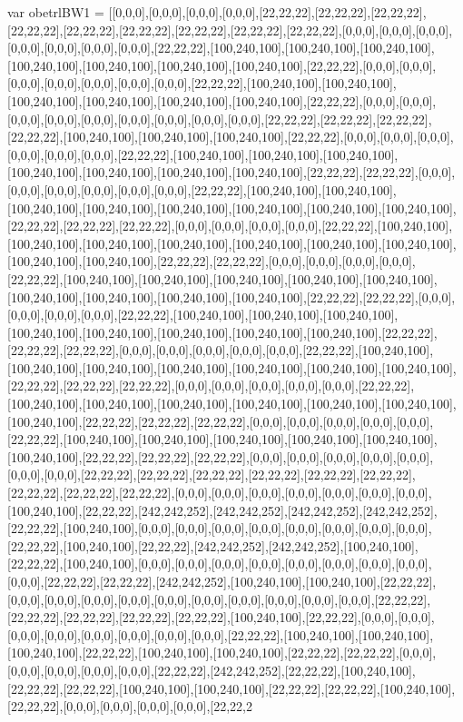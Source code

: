 var obetrlBW1 = [[0,0,0],[0,0,0],[0,0,0],[0,0,0],[22,22,22],[22,22,22],[22,22,22],[22,22,22],[22,22,22],[22,22,22],[22,22,22],[22,22,22],[22,22,22],[0,0,0],[0,0,0],[0,0,0],[0,0,0],[0,0,0],[0,0,0],[0,0,0],[22,22,22],[100,240,100],[100,240,100],[100,240,100],[100,240,100],[100,240,100],[100,240,100],[100,240,100],[22,22,22],[0,0,0],[0,0,0],[0,0,0],[0,0,0],[0,0,0],[0,0,0],[0,0,0],[22,22,22],[100,240,100],[100,240,100],[100,240,100],[100,240,100],[100,240,100],[100,240,100],[22,22,22],[0,0,0],[0,0,0],[0,0,0],[0,0,0],[0,0,0],[0,0,0],[0,0,0],[0,0,0],[0,0,0],[22,22,22],[22,22,22],[22,22,22],[22,22,22],[100,240,100],[100,240,100],[100,240,100],[22,22,22],[0,0,0],[0,0,0],[0,0,0],[0,0,0],[0,0,0],[0,0,0],[22,22,22],[100,240,100],[100,240,100],[100,240,100],[100,240,100],[100,240,100],[100,240,100],[100,240,100],[22,22,22],[22,22,22],[0,0,0],[0,0,0],[0,0,0],[0,0,0],[0,0,0],[0,0,0],[22,22,22],[100,240,100],[100,240,100],[100,240,100],[100,240,100],[100,240,100],[100,240,100],[100,240,100],[100,240,100],[22,22,22],[22,22,22],[22,22,22],[0,0,0],[0,0,0],[0,0,0],[0,0,0],[22,22,22],[100,240,100],[100,240,100],[100,240,100],[100,240,100],[100,240,100],[100,240,100],[100,240,100],[100,240,100],[100,240,100],[22,22,22],[22,22,22],[0,0,0],[0,0,0],[0,0,0],[0,0,0],[22,22,22],[100,240,100],[100,240,100],[100,240,100],[100,240,100],[100,240,100],[100,240,100],[100,240,100],[100,240,100],[100,240,100],[22,22,22],[22,22,22],[0,0,0],[0,0,0],[0,0,0],[0,0,0],[22,22,22],[100,240,100],[100,240,100],[100,240,100],[100,240,100],[100,240,100],[100,240,100],[100,240,100],[100,240,100],[22,22,22],[22,22,22],[22,22,22],[0,0,0],[0,0,0],[0,0,0],[0,0,0],[0,0,0],[22,22,22],[100,240,100],[100,240,100],[100,240,100],[100,240,100],[100,240,100],[100,240,100],[100,240,100],[22,22,22],[22,22,22],[22,22,22],[0,0,0],[0,0,0],[0,0,0],[0,0,0],[0,0,0],[22,22,22],[100,240,100],[100,240,100],[100,240,100],[100,240,100],[100,240,100],[100,240,100],[100,240,100],[22,22,22],[22,22,22],[22,22,22],[0,0,0],[0,0,0],[0,0,0],[0,0,0],[0,0,0],[22,22,22],[100,240,100],[100,240,100],[100,240,100],[100,240,100],[100,240,100],[100,240,100],[22,22,22],[22,22,22],[22,22,22],[0,0,0],[0,0,0],[0,0,0],[0,0,0],[0,0,0],[0,0,0],[0,0,0],[22,22,22],[22,22,22],[22,22,22],[22,22,22],[22,22,22],[22,22,22],[22,22,22],[22,22,22],[22,22,22],[0,0,0],[0,0,0],[0,0,0],[0,0,0],[0,0,0],[0,0,0],[0,0,0],[100,240,100],[22,22,22],[242,242,252],[242,242,252],[242,242,252],[242,242,252],[22,22,22],[100,240,100],[0,0,0],[0,0,0],[0,0,0],[0,0,0],[0,0,0],[0,0,0],[0,0,0],[0,0,0],[22,22,22],[100,240,100],[22,22,22],[242,242,252],[242,242,252],[100,240,100],[22,22,22],[100,240,100],[0,0,0],[0,0,0],[0,0,0],[0,0,0],[0,0,0],[0,0,0],[0,0,0],[0,0,0],[0,0,0],[22,22,22],[22,22,22],[242,242,252],[100,240,100],[100,240,100],[22,22,22],[0,0,0],[0,0,0],[0,0,0],[0,0,0],[0,0,0],[0,0,0],[0,0,0],[0,0,0],[0,0,0],[0,0,0],[22,22,22],[22,22,22],[22,22,22],[22,22,22],[22,22,22],[100,240,100],[22,22,22],[0,0,0],[0,0,0],[0,0,0],[0,0,0],[0,0,0],[0,0,0],[0,0,0],[0,0,0],[22,22,22],[100,240,100],[100,240,100],[100,240,100],[22,22,22],[100,240,100],[100,240,100],[22,22,22],[22,22,22],[0,0,0],[0,0,0],[0,0,0],[0,0,0],[0,0,0],[22,22,22],[242,242,252],[22,22,22],[100,240,100],[22,22,22],[22,22,22],[100,240,100],[100,240,100],[22,22,22],[22,22,22],[100,240,100],[22,22,22],[0,0,0],[0,0,0],[0,0,0],[0,0,0],[22,22,2